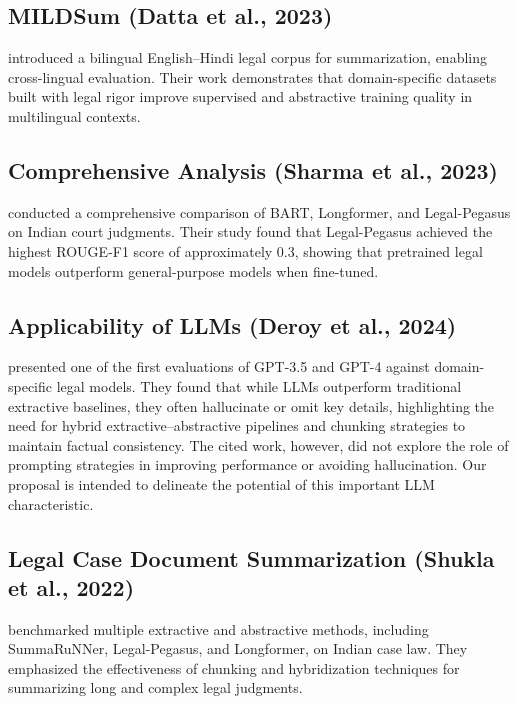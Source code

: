 \documentclass[sigconf]{acmart}
\begin{document}
\subsection{MILDSum (Datta et al., 2023)}
\citet{datta2023mildsum} introduced a bilingual English–Hindi legal corpus for summarization, enabling cross-lingual evaluation.
Their work demonstrates that domain-specific datasets built with legal rigor improve supervised and abstractive training quality in multilingual contexts.

\subsection{Comprehensive Analysis (Sharma et al., 2023)}
\citet{sharma2023comprehensive} conducted a comprehensive comparison of BART, Longformer, and Legal-Pegasus on Indian court judgments.  
Their study found that Legal-Pegasus achieved the highest ROUGE-F1 score of approximately $0.3$, showing that pretrained legal models outperform general-purpose models when fine-tuned.

\subsection{Applicability of LLMs (Deroy et al., 2024)}
\citet{deroy2024applicability} presented one of the first evaluations of GPT-3.5 and GPT-4 against domain-specific legal models.  
They found that while LLMs outperform traditional extractive baselines, they often hallucinate or omit key details, highlighting the need for hybrid extractive–abstractive pipelines and chunking strategies to maintain factual consistency. The cited work, however, did not explore the role of prompting strategies in improving performance or avoiding hallucination. Our proposal is intended to delineate the potential of this important LLM characteristic.

\subsection{Legal Case Document Summarization (Shukla et al., 2022)}
\citet{shukla2022legal} benchmarked multiple extractive and abstractive methods, including SummaRuNNer, Legal-Pegasus, and Longformer, on Indian case law.  
They emphasized the effectiveness of chunking and hybridization techniques for summarizing long and complex legal judgments.
\end{document}
